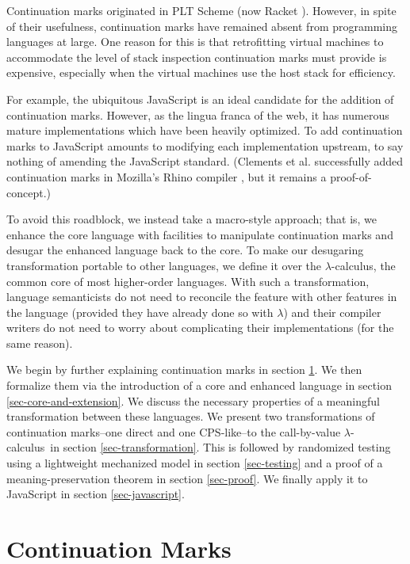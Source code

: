 \documentclass{llncs}
\newcommand{\lc}[0]{$\lambda$-calculus}
\begin{document}
Continuation marks originated in PLT Scheme (now Racket \cite{plt-tr1}). However, in spite of their usefulness, continuation marks have remained absent from programming languages at large. One reason for this is that retrofitting virtual machines to accommodate the level of stack inspection continuation marks must provide is expensive, especially when the virtual machines use the host stack for efficiency.

For example, the ubiquitous JavaScript is an ideal candidate for the addition of continuation marks. However, as the lingua franca of the web, it has numerous mature implementations which have been heavily optimized. To add continuation marks to JavaScript amounts to modifying each implementation upstream, to say nothing of amending the JavaScript standard. (Clements et al. successfully added continuation marks in Mozilla's Rhino compiler \cite{clements2008implementing}, but it remains a proof-of-concept.)

To avoid this roadblock, we instead take a macro-style approach; that is, we enhance the core language with facilities to manipulate continuation marks and desugar the enhanced language back to the core. To make our desugaring transformation portable to other languages, we define it over the \lc, the common core of most higher-order languages. With such a transformation, language semanticists do not need to reconcile the feature with other features in the language (provided they have already done so with $\lambda$) and their compiler writers do not need to worry about complicating their implementations (for the same reason).

We begin by further explaining continuation marks in section \ref{sec-continuation-marks}. We then formalize them via the introduction of a core and enhanced language in section \ref{sec-core-and-extension}. We discuss the necessary properties of a meaningful transformation between these languages. We present two transformations of continuation marks--one direct and one CPS-like--to the call-by-value \lc\ in section \ref{sec-transformation}. This is followed by randomized testing using a lightweight mechanized model in section \ref{sec-testing} and a proof of a meaning-preservation theorem in section \ref{sec-proof}. We finally apply it to JavaScript in section \ref{sec-javascript}.

\section{Continuation Marks}
\label{sec-continuation-marks}
\end{document}
